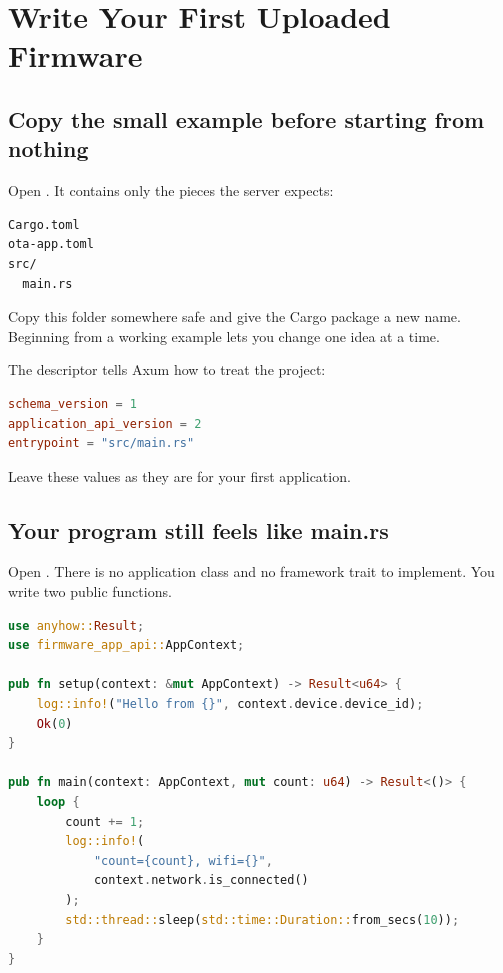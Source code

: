 \chapter{Write Your First Uploaded Firmware}

\section{Copy the small example before starting from nothing}

Open . It contains only the pieces the server expects:

\begin{lstlisting}[numbers=none]
Cargo.toml
ota-app.toml
src/
  main.rs
\end{lstlisting}

Copy this folder somewhere safe and give the Cargo package a new name. Beginning from a working example lets you change one idea at a time.

The descriptor tells Axum how to treat the project:

\begin{lstlisting}[language=TOML,numbers=none]
schema_version = 1
application_api_version = 2
entrypoint = "src/main.rs"
\end{lstlisting}

Leave these values as they are for your first application.

\section{Your program still feels like main.rs}

Open . There is no application class and no framework trait to implement. You write two public functions.

\begin{lstlisting}[language=Rust]
use anyhow::Result;
use firmware_app_api::AppContext;

pub fn setup(context: &mut AppContext) -> Result<u64> {
    log::info!("Hello from {}", context.device.device_id);
    Ok(0)
}

pub fn main(context: AppContext, mut count: u64) -> Result<()> {
    loop {
        count += 1;
        log::info!(
            "count={count}, wifi={}",
            context.network.is_connected()
        );
        std::thread::sleep(std::time::Duration::from_secs(10));
    }
}
\end{lstlisting}

